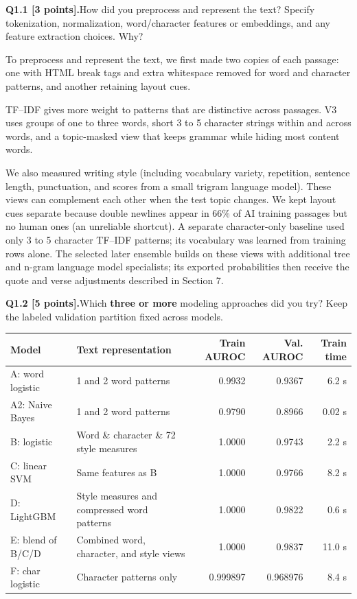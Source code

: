 \documentclass[11pt,letterpaper]{article}
\newcommand{\question}[2]{\needspace{4\baselineskip}\par\addvspace{0.45em}\noindent\textbf{#1}\quad #2\par\nobreak\vspace{0.1em}}
\begin{document}
\question{Q1.1 [3 points].}{How did you preprocess and represent the text? Specify tokenization, normalization, word/character features or embeddings, and any feature extraction choices. Why?}
To preprocess and represent the text, we first made two copies of each passage: one with HTML break tags and extra whitespace removed for word and character patterns, and another retaining layout cues.

TF--IDF gives more weight to patterns that are distinctive across passages. V3 uses groups of one to three words, short 3 to 5 character strings within and across words, and a topic-masked view that keeps grammar while hiding most content words.

We also measured writing style (including vocabulary variety, repetition, sentence length, punctuation, and scores from a small trigram language model). These views can complement each other when the test topic changes. We kept layout cues separate because double newlines appear in 66\% of AI training passages but no human ones (an unreliable shortcut). A separate character-only baseline used only 3 to 5 character TF--IDF patterns; its vocabulary was learned from training rows alone. The selected later ensemble builds on these views with additional tree and n-gram language model specialists; its exported probabilities then receive the quote and verse adjustments described in Section 7.
\question{Q1.2 [5 points].}{Which \textbf{three or more} modeling approaches did you try? Keep the labeled validation partition fixed across models.}
\begin{tabularx}{\linewidth}{@{}p{1.24in}Yrrr@{}}\toprule
Model & Text representation & Train AUROC & Val. AUROC & Train time \\ \midrule
A: word logistic & 1 and 2 word patterns & 0.9932 & 0.9367 & 6.2 s \\
A2: Naive Bayes & 1 and 2 word patterns & 0.9790 & 0.8966 & 0.02 s \\
B: logistic & Word \& character \& 72 style measures & 1.0000 & 0.9743 & 2.2 s \\
C: linear SVM & Same features as B & 1.0000 & 0.9766 & 8.2 s \\
D: LightGBM & Style measures and compressed word patterns & 1.0000 & 0.9822 & 0.6 s \\
E: blend of B/C/D & Combined word, character, and style views & 1.0000 & 0.9837 & 11.0 s \\
F: char logistic & Character patterns only & 0.999897 & 0.968976 & 8.4 s \\
\bottomrule\end{tabularx}
\end{document}
